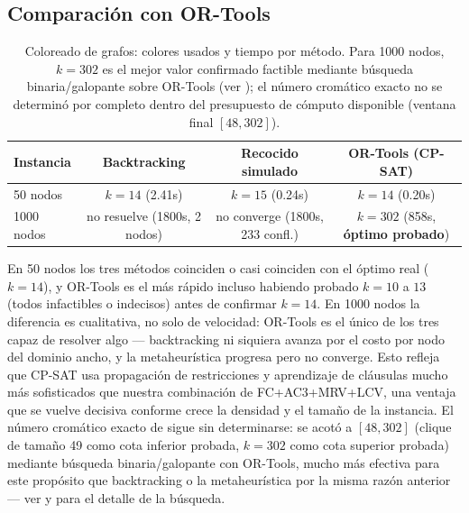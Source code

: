 \subsection{Comparaci\'on con OR-Tools}
\label{sec:coloring-ortools-1000}

\begin{table}[H]
\centering
\begin{tabular}{@{}lccc@{}}
\toprule
Instancia & Backtracking & Recocido simulado & OR-Tools (CP-SAT) \\
\midrule
50 nodos & $k=14$ (2.41s) & $k=15$ (0.24s) & $k=14$ (0.20s) \\
1000 nodos & no resuelve (1800s, 2 nodos) & no converge (1800s, 233 confl.) & $k=302$ (858s, \textbf{óptimo probado}) \\
\bottomrule
\end{tabular}
\caption{Coloreado de grafos: colores usados y tiempo por método. Para 1000 nodos, $k=302$ es
el mejor valor confirmado factible mediante búsqueda binaria/galopante sobre OR-Tools (ver
); el número cromático exacto no se
determinó por completo dentro del presupuesto de cómputo disponible (ventana final $[48, 302]$).}
\end{table}

En 50 nodos los tres métodos coinciden o casi coinciden con el óptimo real ($k=14$), y OR-Tools
es el más rápido incluso habiendo probado $k=10$ a $13$ (todos infactibles o indecisos) antes de
confirmar $k=14$. En 1000 nodos la diferencia es cualitativa, no solo de velocidad: OR-Tools es
el \'unico de los tres capaz de resolver algo --- backtracking ni siquiera avanza por el costo
por nodo del dominio ancho, y la metaheurística progresa pero no converge. Esto refleja que
CP-SAT usa propagación de restricciones y aprendizaje de cláusulas mucho más sofisticados que
nuestra combinación de FC+AC3+MRV+LCV, una ventaja que se vuelve decisiva conforme crece la
densidad y el tamaño de la instancia. El número cromático exacto de 
sigue sin determinarse: se acotó a $[48, 302]$ (clique de tamaño 49 como cota inferior probada,
$k=302$ como cota superior probada) mediante búsqueda binaria/galopante con OR-Tools, mucho más
efectiva para este propósito que backtracking o la metaheurística por la misma razón anterior
--- ver  y
 para el detalle de la búsqueda.
